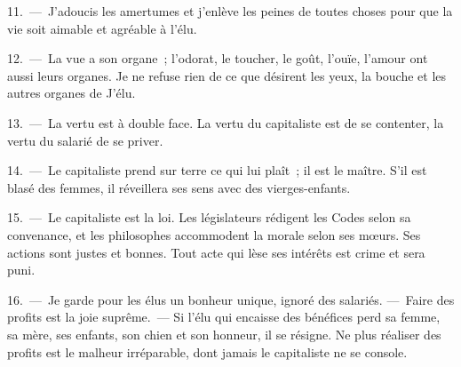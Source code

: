 \documentclass[french,twoside]{book} %
\begin{document}
11. — J'adoucis les amertumes et j’enlève les peines de toutes choses pour que la vie soit aimable et agréable à l’élu.\par
12. — La vue a son organe ; l’odorat, le toucher, le goût, l’ouïe, l’amour ont aussi leurs organes. Je ne refuse rien de ce que désirent les yeux, la bouche et les autres organes de J'élu.\par
13. — La vertu est à double face. La vertu du capitaliste est de se contenter, la vertu du salarié de se priver.\par
14. — Le capitaliste prend sur terre ce qui lui plaît ; il est le maître. S'il est blasé des femmes, il réveillera ses sens avec des vierges-enfants.\par
15. — Le capitaliste est la loi. Les législateurs rédigent les Codes selon sa convenance, et les philosophes accommodent la morale selon ses mœurs. Ses actions sont justes et bonnes. Tout acte qui lèse ses intérêts est crime et sera puni.\par
16. — Je garde pour les élus un bonheur unique, ignoré des salariés. — Faire des profits est la joie suprême. — Si l’élu qui encaisse des bénéfices perd sa femme, sa mère, ses enfants, son chien et son honneur, il se résigne. Ne plus réaliser des profits est le malheur irréparable, dont jamais le capitaliste ne se console.
\end{document}
